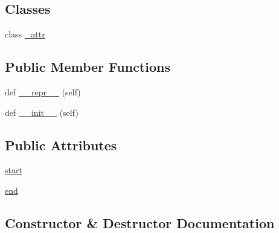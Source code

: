 \subsection*{Classes}
\begin{DoxyCompactItemize}
\item 
class \hyperlink{classdateutil_1_1parser_1_1__parser_1_1__tzparser_1_1__result_1_1__attr}{\+\_\+attr}
\end{DoxyCompactItemize}
\subsection*{Public Member Functions}
\begin{DoxyCompactItemize}
\item 
def \hyperlink{classdateutil_1_1parser_1_1__parser_1_1__tzparser_1_1__result_ac3ce8e8807ca735d82ccdc896d57e71f}{\+\_\+\+\_\+repr\+\_\+\+\_\+} (self)
\item 
def \hyperlink{classdateutil_1_1parser_1_1__parser_1_1__tzparser_1_1__result_a3cca6f2867c9a29881e9113b5cf739bb}{\+\_\+\+\_\+init\+\_\+\+\_\+} (self)
\end{DoxyCompactItemize}
\subsection*{Public Attributes}
\begin{DoxyCompactItemize}
\item 
\hyperlink{classdateutil_1_1parser_1_1__parser_1_1__tzparser_1_1__result_a4c70bcaa2401543df57b44de0ad3188f}{start}
\item 
\hyperlink{classdateutil_1_1parser_1_1__parser_1_1__tzparser_1_1__result_ab2e706905ad6a71b2fca9b99043c3fc6}{end}
\end{DoxyCompactItemize}


\subsection{Constructor \& Destructor Documentation}
\mbox{\label{classdateutil_1_1parser_1_1__parser_1_1__tzparser_1_1__result_a3cca6f2867c9a29881e9113b5cf739bb}} 
